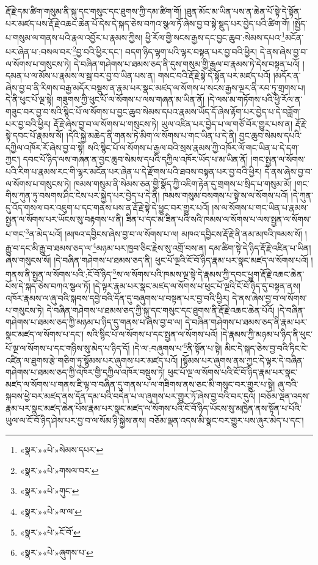 རྡོ་རྗེ་དམ་ཚིག་གསུམ་ནི་སྐུ་དང་གསུང་དང་ཐུགས་ཀྱི་དམ་ཚིག་གོ། །ཐུན་མོང་མ་ཡིན་པས་ན་ཆེན་པོ་སྟེ་དེ་སྟོན་པར་མཛད་པས་རྡོ་རྗེ་འཆང་ཆེན་པོ་དེས་དེ་སྐད་ཅེས་བཀའ་སྩལ་ཏོ་ཞེས་བྱ་བ་སྟེ་སྡུད་པར་བྱེད་པའི་ཚིག་གོ། །སྤྱོད་པ་གསུམ་ལ་གནས་པའི་རྣལ་འབྱོར་པ་རྣམས་ཀྱིས། ཕྱི་རོལ་གྱི་སངས་རྒྱས་དང་བྱང་ཆུབ་:སེམས་དཔའ་\footnote{«སྣར་»«པེ་»སེམས་དཔར་}མངོན་པར་ཞེན་པ་:བསལ་བར་\footnote{«སྣར་»«པེ་»གསལ་བར་}བྱ་བའི་ཕྱིར་དང་། བདག་ཉིད་ལྷག་པའི་ལྷར་བསྟན་པར་བྱ་བའི་ཕྱིར། དེ་ནས་ཞེས་བྱ་བ་ལ་སོགས་པ་གསུངས་ཏེ། དེ་བཞིན་གཤེགས་པ་ཐམས་ཅད་ནི་དུས་གསུམ་གྱི་རྒྱལ་བ་རྣམས་ཏེ་དེས་བསྟན་པའོ། །དམན་པ་ལ་མོས་པ་རྣམས་ལ་སྦ་བར་བྱ་བ་ཡིན་པས་ན། གསང་བའི་རྡོ་རྗེ་སྟེ་དེ་སྟོན་པར་མཛད་པའོ། །མདོར་ན་ཞེས་བྱ་བ་ནི་རིགས་བརྒྱ་མདོར་བསྡུས་ན་རྣམ་པར་སྣང་མཛད་ལ་སོགས་པ་སངས་རྒྱས་ལྔར་ནི་རབ་ཏུ་གྲགས་པ། དེ་ནི་ཕུང་པོ་ལྔ་སྟེ། གཟུགས་ཀྱི་ཕུང་པོ་ལ་སོགས་པ་ལས་གཞན་མ་ཡིན་ནོ། །དེ་ལས་མ་གཏོགས་པའི་ཕྱི་རོལ་ན་གཟུང་བར་བྱ་བ་སའི་སྙིང་པོ་ལ་སོགས་པ་བྱང་ཆུབ་སེམས་དཔའ་རྣམས་ཡོད་དོ་ཞེས་རྟོག་པར་བྱེད་པ་དེ་བཟློག་པར་བྱ་བའི་ཕྱིར། རྡོ་རྗེ་ཞེས་བྱ་བ་ལ་སོགས་པ་གསུངས་ཏེ། ཡུལ་འཛིན་པར་བྱེད་པ་ལ་གཙོ་བོར་གྱུར་པས་ན། རྡོ་རྗེ་སྟེ་དབང་པོ་རྣམས་སོ། །དེའི་སྐྱེ་མཆེད་ནི་གནས་ཏེ་མིག་ལ་སོགས་པ་གང་ཡིན་པ་དེ་ནི། བྱང་ཆུབ་སེམས་དཔའི་དཀྱིལ་འཁོར་རོ་ཞེས་བྱ་བ་སྟེ། སའི་སྙིང་པོ་ལ་སོགས་པ་རྒྱལ་བའི་སྲས་རྣམས་ཀྱི་འཁོར་ལོ་གང་ཡིན་པ་དེ་དག་ཀྱང་། དབང་པོ་ཉིད་ལས་གཞན་ན་བྱང་ཆུབ་སེམས་དཔའི་དཀྱིལ་འཁོར་ཡོད་པ་མ་ཡིན་ནོ། །གང་སྤྱན་ལ་སོགས་པའི་རིག་པ་རྣམས་རང་གི་ལྷར་མངོན་པར་ཞེན་པ་དེ་རྫོགས་པའི་ཐབས་བསྟན་པར་བྱ་བའི་ཕྱིར། དེ་ནས་ཞེས་བྱ་བ་ལ་སོགས་པ་གསུངས་ཏེ། ཁམས་གསུམ་ནི་སེམས་ཅན་གྱི་སྣོད་ཀྱི་འཇིག་རྟེན་དུ་གྲགས་པ་སྲིད་པ་གསུམ་མོ། །གང་གིས་ཀུན་ཏུ་བསགས་ཤིང་ངེས་པར་སྐྱེད་པར་བྱེད་པ་དེ་ནི། ཁམས་གསུམ་བསགས་པ་སྟེ་ས་ལ་སོགས་པའོ། །དེ་ཀུན་དུ་འོད་གསལ་བར་འཇུག་པ་དང་གནས་པས་ན་རྡོ་རྗེ་སྟེ་དེ་ཕྱུང་བར་གྱུར་པའོ། །ས་ལ་སོགས་པ་གང་ཡིན་པ་རྣམས་སྤྱན་ལ་སོགས་པར་ཡོངས་སུ་བརྟགས་པ་ནི། ཟིན་པ་དང་མ་ཟིན་པའི་སའི་ཁམས་ལ་སོགས་པ་ལས་སྤྱན་ལ་སོགས་པ་གང་\footnote{«སྣར་»«པེ་»གུང་}ན་མེད་པའོ། །མཁའ་དབྱིངས་ཞེས་བྱ་བ་ལ་སོགས་པ་ལ། མཁའ་དབྱིངས་རྡོ་རྗེ་ནི་ནམ་མཁའི་ཁམས་སོ། །རྒྱུ་བ་དང་མི་རྒྱུ་བ་ཐམས་ཅད་ལ་\footnote{«སྣར་»«པེ་»ལ་ལ་}མཉམ་པར་ཁྱབ་ཅིང་རྗེས་སུ་འགྲོ་བས་ན། དམ་ཚིག་སྟེ་དེ་ཉིད་རྡོ་རྗེ་འཛིན་པ་ཡིན། ཞེས་གསུངས་སོ། །དེ་བཞིན་གཤེགས་པ་ཐམས་ཅད་ནི། ཕུང་པོ་ལྔའི་ངོ་བོ་ཉིད་རྣམ་པར་སྣང་མཛད་ལ་སོགས་པའོ། །གནས་ནི་སྤྱན་ལ་སོགས་པའི་:ངོ་བོ་ཉིད་\footnote{«སྣར་»«པེ་»ངོ་བོ་}ས་ལ་སོགས་པའི་ཁམས་ལྔ་སྟེ་དེ་རྣམས་ཀྱི་དབང་ཕྱུག་རྡོ་རྗེ་འཆང་ཆེན་པོས་དེ་སྐད་ཅེས་བཀའ་སྩལ་ཏོ། །དེ་ལྟར་རྣམ་པར་སྣང་མཛད་ལ་སོགས་པ་ཕུང་པོ་ལྔའི་ངོ་བོ་ཉིད་དུ་བསྟན་ནས། འཁོར་རྣམས་ལ་ཞུ་བའི་སྐབས་དབྱེ་བའི་དོན་དུ་བཞུགས་པ་བསྟན་པར་བྱ་བའི་ཕྱིར། དེ་ནས་ཞེས་བྱ་བ་ལ་སོགས་པ་གསུངས་ཏེ། དེ་བཞིན་གཤེགས་པ་ཐམས་ཅད་ཀྱི་སྐུ་དང་གསུང་དང་ཐུགས་ནི་རྡོ་རྗེ་འཆང་ཆེན་པོའོ། །དེ་བཞིན་གཤེགས་པ་ཐམས་ཅད་ཀྱི་མཉམ་པ་ཉིད་དུ་གནས་པ་ཞེས་བྱ་བ་ལ། དེ་བཞིན་གཤེགས་པ་ཐམས་ཅད་ནི་རྣམ་པར་སྣང་མཛད་ལ་སོགས་པ་དང་། སའི་སྙིང་པོ་ལ་སོགས་པ་དང་སྤྱན་ལ་སོགས་པའོ། །དེ་རྣམས་ཀྱི་མཉམ་པ་ཉིད་ནི་ཕུང་པོ་ལྔ་ལ་སོགས་པ་དང་གཉིས་སུ་མེད་པ་ཉིད་དོ། །དེ་ལ་:བཞུགས་པ་\footnote{«སྣར་»«པེ་»ཞུགས་པ་}ནི་སྟོན་པ་སྟེ། མིང་དེ་སྐད་ཅེས་བྱ་བའི་ཏིང་ངེ་འཛིན་ལ་ཐུགས་རྩེ་གཅིག་ཏུ་སྙོམས་པར་ཞུགས་པར་མཛད་པའོ། །སྙོམས་པར་ཞུགས་ནས་ཀྱང་དེ་ལྟར་དེ་བཞིན་གཤེགས་པ་ཐམས་ཅད་ཀྱི་འཁོར་གྱི་དཀྱིལ་འཁོར་བསྡུས་ཏེ། ཕུང་པོ་ལྔ་ལ་སོགས་པའི་ངོ་བོ་ཉིད་རྣམ་པར་སྣང་མཛད་ལ་སོགས་པ་གནས་ཇི་ལྟ་བ་བཞིན་དུ་གནས་པ་ལ་གཟིགས་ནས་ཅང་མི་གསུང་བར་གྱུར་པ་སྟེ། ཞུ་བའི་སྐབས་ཕྱེ་བར་མཛད་ནས་དོན་དམ་པའི་བདེན་པ་ལ་ཞུགས་པར་གྱུར་ཏོ་ཞེས་བྱ་བའི་བར་དུའོ། །བཅོམ་ལྡན་འདས་རྣམ་པར་སྣང་མཛད་ཆེན་པོས་རྣམ་པར་སྣང་མཛད་ལ་སོགས་པའི་ངོ་བོ་ཉིད་ཡོངས་སུ་མཁྱེན་ནས་སྟོན་པ་པོའི་ཡུལ་ལ་ངོ་བོ་ཉིད་ཤེས་པར་བྱ་བ་ལ་སོམ་ཉི་སྐྱེས་ནས། བཅོམ་ལྡན་འདས་མི་སྣང་བར་གྱུར་པས་ཞུར་མེད་པ་དང་། 